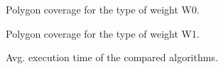 \documentclass[runningheads,a4paper]{elsarticle}
\begin{document}
    \begin{figure}[!ht]
    	\centering{}
    	\caption{Polygon coverage for the type of weight W0.}
    	\label{fig:covw0}
    \end{figure}

    \begin{figure}[!ht]
    	\centering
    	\centering{}
    	\caption{Polygon coverage for the type of weight W1.}
    	\label{fig:covw1}
    \end{figure}

    \begin{figure}[!ht]
    	\centering
    	\caption{Avg. execution time of the compared algorithms.}
    	\label{fig:timealg}
    \end{figure}
\end{document}
